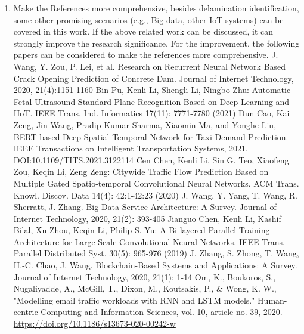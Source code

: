 \documentclass[11pt,a2paper]{report}
\begin{document}
\begin{enumerate}
			\item Make the References more comprehensive, besides delamination 
			identification, some other promising scenarios (e.g., Big data, 
			other IoT systems) can be covered in this work.
			If the above related work can be discussed, it can strongly improve 
			the research significance. For the improvement, the following 
			papers can be considered to make the references more comprehensive.
			\newline
			\newline
			\newline
			J. Wang, Y. Zou, P. Lei, et al. Research on Recurrent Neural 
			Network Based Crack Opening Prediction of Concrete Dam. Journal of 
			Internet Technology, 2020, 21(4):1151-1160
			\newline
			\newline
			Bin Pu, Kenli Li, Shengli Li, Ningbo Zhu: Automatic Fetal 
			Ultrasound Standard Plane Recognition Based on Deep Learning and 
			IIoT. IEEE Trans. Ind. Informatics 17(11): 7771-7780 (2021)
			\newline
			\newline
			Dun Cao, Kai Zeng, Jin Wang, Pradip Kumar Sharma, Xiaomin Ma, and 
			Yonghe Liu, BERT-based Deep Spatial-Temporal Network for Taxi 
			Demand 
			Prediction. IEEE Transactions on Intelligent Transportation 
			Systems, 2021, DOI:10.1109/TITS.2021.3122114
			\newline
			\newline
			Cen Chen, Kenli Li, Sin G. Teo, Xiaofeng Zou, Keqin Li, Zeng Zeng: 
			Citywide Traffic Flow Prediction Based on Multiple Gated 
			Spatio-temporal Convolutional Neural Networks. ACM Trans. Knowl. 
			Discov. Data 14(4): 42:1-42:23 (2020)
			\newline
			\newline
			J. Wang, Y. Yang, T. Wang, R. Sherratt, J. Zhang. Big Data Service 
			Architecture: A Survey. Journal of Internet Technology, 2020, 
			21(2): 393-405
			\newline
			\newline
			Jianguo Chen, Kenli Li, Kashif Bilal, Xu Zhou, Keqin Li, Philip S. 
			Yu: A Bi-layered Parallel Training Architecture for Large-Scale 
			Convolutional Neural Networks. IEEE Trans. Parallel Distributed 
			Syst. 30(5): 965-976 (2019)
			\newline
			\newline
			J. Zhang, S. Zhong, T. Wang, H.-C. Chao, J. Wang. Blockchain-Based 
			Systems and Applications: A Survey. Journal of Internet Technology, 
			2020, 21(1): 1-14
			\newline
			\newline
			Om, K., Boukoros, S., Nugaliyadde, A., McGill, T., Dixon, M., 
			Koutsakis, P., \& Wong, K. W., "Modelling email traffic workloads 
			with RNN and LSTM models." Human-centric Computing and Information 
			Sciences, vol. 10, article no. 39, 2020. 
			\url{https://doi.org/10.1186/s13673-020-00242-w}
			


\end{enumerate}
\end{document}
